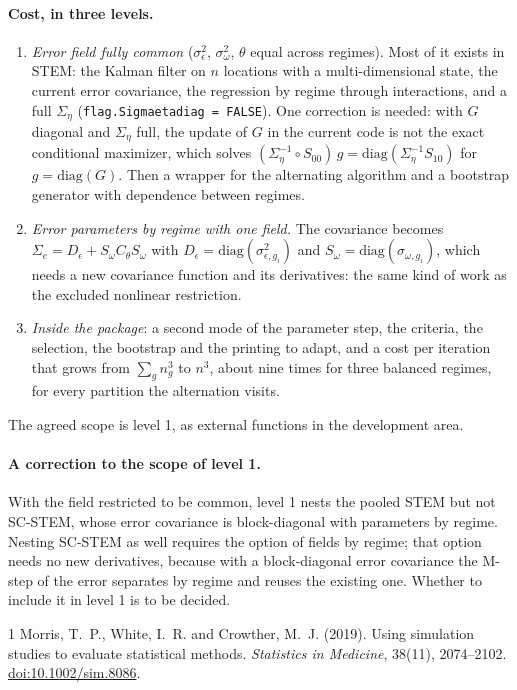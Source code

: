 \documentclass[11pt]{article}
\begin{document}
\paragraph{Cost, in three levels.}
\begin{enumerate}[leftmargin=2em]
  \item \emph{Error field fully common} ($\sigma^2_\epsilon$, $\sigma^2_\omega$, $\theta$ equal across regimes). Most of it exists in STEM: the Kalman filter on $n$ locations with a multi-dimensional state, the current error covariance, the regression by regime through interactions, and a full $\Sigma_\eta$ (\texttt{flag.Sigmaetadiag = FALSE}). One correction is needed: with $G$ diagonal and $\Sigma_\eta$ full, the update of $G$ in the current code is not the exact conditional maximizer, which solves $(\Sigma_\eta^{-1} \circ S_{00})\, g = \mathrm{diag}(\Sigma_\eta^{-1} S_{10})$ for $g = \mathrm{diag}(G)$. Then a wrapper for the alternating algorithm and a bootstrap generator with dependence between regimes.
  \item \emph{Error parameters by regime with one field.} The covariance becomes $\Sigma_e = D_\epsilon + S_\omega C_\theta S_\omega$ with $D_\epsilon = \mathrm{diag}(\sigma^2_{\epsilon,g_i})$ and $S_\omega = \mathrm{diag}(\sigma_{\omega,g_i})$, which needs a new covariance function and its derivatives: the same kind of work as the excluded nonlinear restriction.
  \item \emph{Inside the package}: a second mode of the parameter step, the criteria, the selection, the bootstrap and the printing to adapt, and a cost per iteration that grows from $\sum_g n_g^3$ to $n^3$, about nine times for three balanced regimes, for every partition the alternation visits.
\end{enumerate}
The agreed scope is level 1, as external functions in the development area.

\paragraph{A correction to the scope of level 1.} With the field restricted to be common, level 1 nests the pooled STEM but not SC-STEM, whose error covariance is block-diagonal with parameters by regime. Nesting SC-STEM as well requires the option of fields by regime; that option needs no new derivatives, because with a block-diagonal error covariance the M-step of the error separates by regime and reuses the existing one. Whether to include it in level 1 is to be decided.

\begin{thebibliography}{1}
Morris, T.~P., White, I.~R. and Crowther, M.~J. (2019).
\newblock Using simulation studies to evaluate statistical methods.
\newblock \emph{Statistics in Medicine}, 38(11), 2074--2102.
\newblock \href{https://doi.org/10.1002/sim.8086}{doi:10.1002/sim.8086}.
\end{thebibliography}
\end{document}
